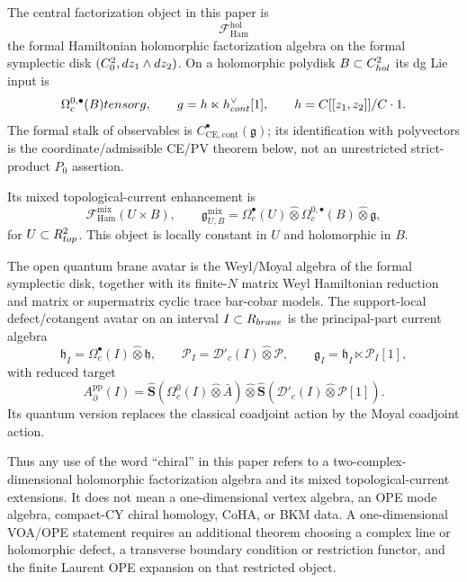 \documentclass[11pt]{memoir}
\begin{document}
\begin{defn}\label{def:local-hamiltonian-chiral-factorization-algebra}
  The central factorization object in this paper is
  \[
    \mathcal F_{\mathrm{Ham}}^{\mathrm{hol}}
  \]
  the formal Hamiltonian holomorphic factorization algebra on the
  formal symplectic disk
  \((C^2_0,dz_1\wedge dz_2)\).  On a holomorphic polydisk
  \(B\subset C^2_{hol}\) its dg Lie input is
  \[
    \Omega_c^{0,\bullet}(B)tensorg,\qquad
    g=h\ltimes
      h^\vee_{cont}[1],\qquad
    h=C[[z_1,z_2]]/C\cdot1 .
  \]
  The formal stalk of observables is
  \(C^\bullet_{\mathrm{CE},\mathrm{cont}}(\mathfrak g)\); its
  identification with polyvectors is the coordinate/admissible CE/PV
  theorem below, not an unrestricted strict-product \(P_0\) assertion.

  Its mixed topological-current enhancement is
  \[
    \mathcal F_{\mathrm{Ham}}^{\mathrm{mix}}(U\times B),
    \qquad
    \mathfrak g^{\mathrm{mix}}_{U,B}
      =
      \Omega_c^\bullet(U)\widehat\otimes
      \Omega_c^{0,\bullet}(B)\widehat\otimes\mathfrak g ,
  \]
  for \(U\subset R^2_{top}\).  This object is locally constant
  in \(U\) and holomorphic in \(B\).

  The open quantum brane avatar is the Weyl/Moyal algebra of the
  formal symplectic disk, together with its finite-\(N\) matrix Weyl
  Hamiltonian reduction and matrix or supermatrix cyclic trace
  bar-cobar models.  The support-local defect/cotangent avatar on an
  interval \(I\subset R_{brane}\) is the principal-part current
  algebra
  \[
    \mathfrak h_I=\Omega^\bullet_c(I)\widehat\otimes\mathfrak h,\qquad
    \mathcal P_I=\mathcal D'_c(I)\widehat\otimes\mathcal P,\qquad
    \mathfrak g_I=\mathfrak h_I\ltimes\mathcal P_I[1],
  \]
  with reduced target
  \[
    A^{\mathrm{pp}}_\partial(I)
      =
      \widehat{\mathbf S}(\Omega_c^0(I)\widehat\otimes\bar A)
      \widehat\otimes
      \widehat{\mathbf S}(\mathcal D'_c(I)\widehat\otimes\mathcal P[1]).
  \]
  Its quantum version replaces the classical coadjoint action by the
  Moyal coadjoint action.

  Thus any use of the word ``chiral'' in this paper refers to a
  two-complex-dimensional holomorphic factorization algebra and its mixed
  topological-current extensions.  It does not mean a one-dimensional
  vertex algebra, an OPE mode algebra, compact-CY chiral homology, CoHA,
  or BKM data.  A one-dimensional VOA/OPE statement requires an
  additional theorem choosing a complex line or holomorphic defect, a
  transverse boundary condition or restriction functor, and the finite
  Laurent OPE expansion on that restricted object.
\end{defn}
\end{document}
